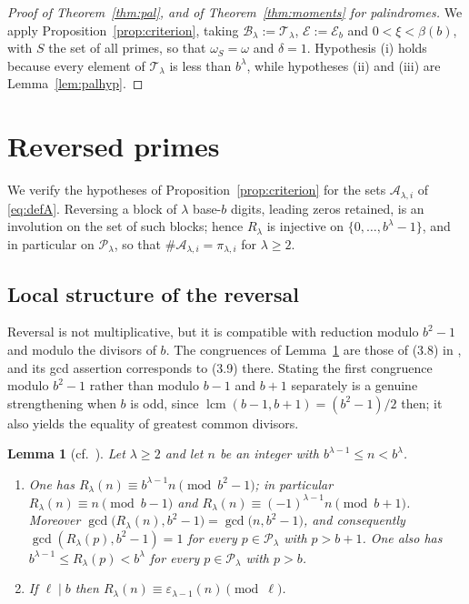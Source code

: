 \documentclass[11pt,a4paper]{article}
\theoremstyle{plain}
\newtheorem{lemma}[theorem]{Lemma}
\theoremstyle{definition}
\newcommand{\eps}{\varepsilon}
\numberwithin{equation}{section}
\begin{document}
\begin{proof}[Proof of Theorem~\ref{thm:pal}, and of Theorem~\ref{thm:moments} for palindromes]
We apply Proposition~\ref{prop:criterion}, taking $\mathcal B_\lambda:=\mathcal T_\lambda$,
$\mathcal E:=\mathcal E_b$ and $0<\xi<\beta(b)$, with $S$ the set of all primes, so that
$\omega_S=\omega$ and $\delta=1$. Hypothesis (i) holds because every element of $\mathcal T_\lambda$ is
less than $b^{\lambda}$, while hypotheses (ii) and (iii) are Lemma~\ref{lem:palhyp}.
\end{proof}

\section{Reversed primes}\label{sec:local}

We verify the hypotheses of Proposition~\ref{prop:criterion} for the sets $\mathcal A_{\lambda,i}$ of
\eqref{eq:defA}. Reversing a block of $\lambda$ base-$b$ digits, leading zeros retained, is an
involution on the set of such blocks; hence $R_\lambda$ is injective on $\{0,\dots,b^{\lambda}-1\}$,
and in particular on $\mathcal P_\lambda$, so that $\#\mathcal A_{\lambda,i}=\pi_{\lambda,i}$ for
$\lambda\ge2$.

\subsection{Local structure of the reversal}

Reversal is not multiplicative, but it is compatible with reduction modulo $b^{2}-1$ and modulo the
divisors of $b$. The congruences of Lemma~\ref{lem:cong} are those of (3.8) in \cite{DRS}, and its gcd
assertion corresponds to (3.9) there. Stating the first congruence modulo $b^{2}-1$ rather than modulo
$b-1$ and $b+1$ separately is a genuine strengthening when $b$ is odd, since
$\operatorname{lcm}(b-1,b+1)=(b^{2}-1)/2$ then; it also yields the equality of greatest common
divisors.

\begin{lemma}[cf.\ {\cite[(3.8), (3.9)]{DRS}}]\label{lem:cong}
Let $\lambda\ge2$ and let $n$ be an integer with $b^{\lambda-1}\le n<b^{\lambda}$.
\begin{enumerate}
\item[\textup{(i)}] One has $R_\lambda(n)\equiv b^{\lambda-1}n\pmod{b^{2}-1}$; in particular
$R_\lambda(n)\equiv n\pmod{b-1}$ and $R_\lambda(n)\equiv(-1)^{\lambda-1}n\pmod{b+1}$. Moreover
$\gcd\bigl(R_\lambda(n),b^{2}-1\bigr)=\gcd\bigl(n,b^{2}-1\bigr)$, and consequently
$\gcd(R_\lambda(p),b^{2}-1)=1$ for every $p\in\mathcal P_\lambda$ with $p>b+1$. One also has
$b^{\lambda-1}\le R_\lambda(p)<b^{\lambda}$ for every $p\in\mathcal P_\lambda$ with $p>b$.
\item[\textup{(ii)}] If $\ell\mid b$ then $R_\lambda(n)\equiv\eps_{\lambda-1}(n)\pmod\ell$.
\end{enumerate}
\end{lemma}
\end{document}
